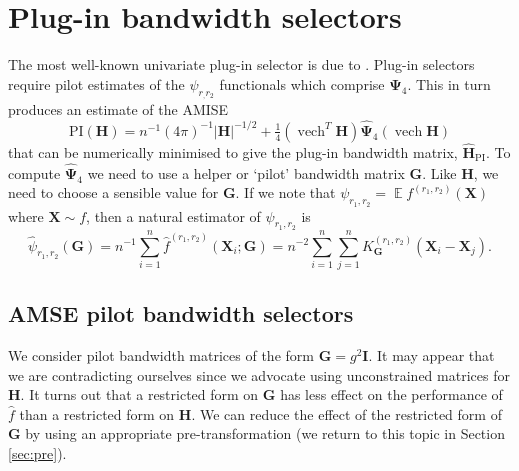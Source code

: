 \documentclass[a4paper,11pt]{article}
\renewcommand{\vec}[1]{\boldsymbol{#1}}
\newcommand{\mat}[1]{\mathbf{#1}}
\newcommand{\gmat}[1]{\boldsymbol{#1}}
\def\Hmat{\mat{H}}
\def\G{\mat{G}}
\def\PI{\mathrm{PI}}
\def\vecX{\vec{X}}
\DeclareMathOperator{\E}{\boldsymbol{\mathbb{E}}}
\DeclareMathOperator{\VECH}{vech}
\begin{document}
\section{Plug-in bandwidth selectors}
\label{sec:plugin}

The most well-known univariate plug-in selector is due to
\citet*{sheather91}.
Plug-in selectors require pilot estimates of the
$\psi_{r_, r_2}$ functionals which comprise 
$\gmat{\Psi}_4$. This in turn produces an estimate of the AMISE
\begin{equation}
\PI (\Hmat) = n^{-1} (4\pi)^{-1} |\Hmat| ^{-1/2}
 + \tfrac{1}{4}  (\VECH^T \Hmat) \hat{\gmat{\Psi}}_4(\VECH \Hmat)
\label{eq:api}
\end{equation}
that can be numerically minimised to give the plug-in bandwidth matrix, 
$\hat{\Hmat}_\PI$.  
To compute $\hat{\gmat{\Psi}}_4$ we need to use a helper or `pilot' bandwidth
matrix $\G$. Like $\Hmat$, we need to choose a sensible value for $\G$.  
If we note that 
$\psi_{r_1, r_2}= \E f^{(r_1, r_2)}(\vec{X})$ where $\vecX \sim f$,
then a natural estimator of $\psi_{r_1, r_2}$ is
\begin{equation}
\hat{\psi}_{r_1, r_2} (\G) = n^{-1}
\sum_{i=1}^n \hat{f}^{(r_1, r_2)} (\vec{X}_i; \G) =
n^{-2}\sum_{i=1}^{n}\sum_{j=1}^{n} K^{(r_1, r_2)}_{\G} (\vec{X}_i -
\vec{X}_j).
\label{psir} 
\end{equation}


\subsection{AMSE pilot bandwidth selectors}

We consider pilot bandwidth matrices of the form 
$\G = g^2 \mat{I}$. It may appear that we are contradicting
ourselves since we advocate using unconstrained matrices for $\Hmat$.
It turns out that a restricted form on $\G$ has less effect on the
performance of $\hat{f}$ than a restricted form on $\Hmat$. We can 
reduce the effect of the restricted form of $\G$ by using
an appropriate pre-transformation 
(we return to this topic in Section \ref{sec:pre}).
\end{document}
